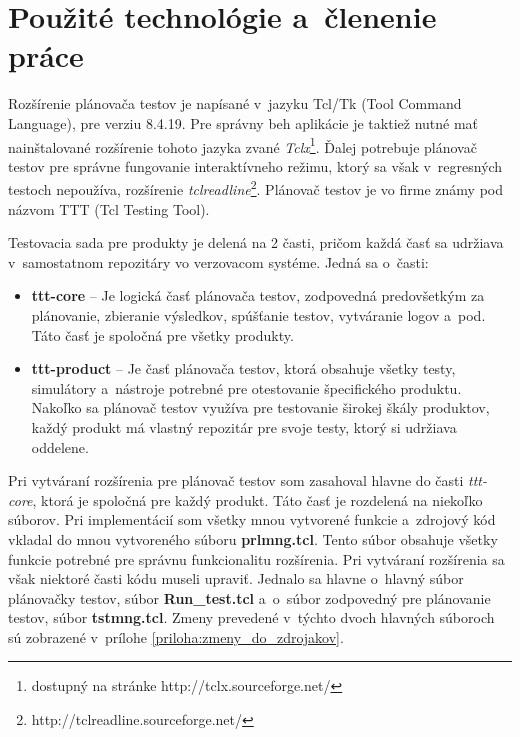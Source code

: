 \section{Použité technológie a~členenie práce}
\label{sekcia:pouzite_technologie}
Rozšírenie plánovača testov je napísané v~jazyku Tcl/Tk 
(Tool Command Language), pre verziu 8.4.19.
Pre správny beh aplikácie je taktiež nutné mať nainštalované rozšírenie 
tohoto jazyka zvané 
\textit{Tclx}\footnote{dostupný na stránke http://tclx.sourceforge.net/}.
Ďalej potrebuje plánovač testov pre správne fungovanie interaktívneho režimu, 
ktorý sa však v~regresných testoch nepoužíva, rozšírenie 
\textit{tclreadline}\footnote{http://tclreadline.sourceforge.net/}.
Plánovač testov je vo firme známy pod názvom TTT (Tcl Testing Tool).

Testovacia sada pre produkty je delená na 2 časti, 
pričom každá časť sa udržiava v~samostatnom repozitáry vo verzovacom 
systéme. Jedná sa o~časti: 
\begin{itemize}
\item \textbf{ttt-core} -- Je logická časť plánovača testov, zodpovedná 
predovšetkým za plánovanie, zbieranie výsledkov,
spúšťanie testov, vytváranie logov a~pod. 
Táto časť je spoločná pre všetky produkty. 
\item \textbf{ttt-product} -- Je časť plánovača testov, ktorá obsahuje 
všetky testy, simulátory a~nástroje potrebné pre otestovanie 
špecifického produktu. Nakoľko sa plánovač testov využíva pre testovanie 
širokej škály produktov, každý produkt má vlastný repozitár pre svoje 
testy, ktorý si udržiava oddelene.
\end{itemize} 

Pri vytváraní rozšírenia pre plánovač testov som zasahoval hlavne do 
časti \textit{ttt-core}, ktorá je spoločná pre každý produkt.
Táto časť je rozdelená na niekoľko súborov. Pri implementácií som všetky 
mnou vytvorené funkcie a~zdrojový kód vkladal do mnou vytvoreného súboru 
\textbf{prlmng.tcl}. 
Tento súbor obsahuje všetky funkcie potrebné pre správnu funkcionalitu 
rozšírenia. Pri vytváraní rozšírenia sa však niektoré časti kódu 
museli upraviť. 
Jednalo sa hlavne o~hlavný súbor plánovačky testov, súbor
\textbf{Run\_test.tcl} a~o~súbor zodpovedný pre plánovanie testov, 
súbor \textbf{tstmng.tcl}. 
Zmeny prevedené v~týchto dvoch hlavných súboroch sú zobrazené 
v~prílohe \ref{priloha:zmeny_do_zdrojakov}.

